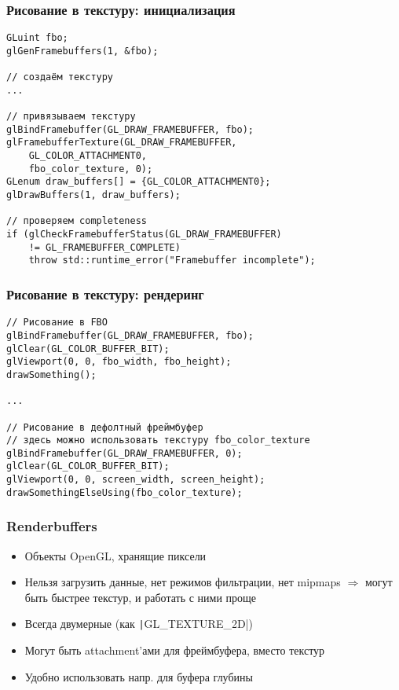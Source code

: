 \documentclass[10pt]{beamer}
\begin{document}
\begin{frame}[fragile]
\frametitle{Рисование в текстуру: инициализация}
\fontsize{8pt}{8pt}
\begin{verbatim}
GLuint fbo;
glGenFramebuffers(1, &fbo);

// создаём текстуру
...

// привязываем текстуру
glBindFramebuffer(GL_DRAW_FRAMEBUFFER, fbo);
glFramebufferTexture(GL_DRAW_FRAMEBUFFER,
    GL_COLOR_ATTACHMENT0,
    fbo_color_texture, 0);
GLenum draw_buffers[] = {GL_COLOR_ATTACHMENT0};
glDrawBuffers(1, draw_buffers);

// проверяем completeness
if (glCheckFramebufferStatus(GL_DRAW_FRAMEBUFFER)
    != GL_FRAMEBUFFER_COMPLETE)
    throw std::runtime_error("Framebuffer incomplete");
\end{verbatim}
\end{frame}

\begin{frame}[fragile]
\frametitle{Рисование в текстуру: рендеринг}
\fontsize{8pt}{8pt}
\begin{verbatim}
// Рисование в FBO
glBindFramebuffer(GL_DRAW_FRAMEBUFFER, fbo);
glClear(GL_COLOR_BUFFER_BIT);
glViewport(0, 0, fbo_width, fbo_height);
drawSomething();

...

// Рисование в дефолтный фреймбуфер
// здесь можно использовать текстуру fbo_color_texture
glBindFramebuffer(GL_DRAW_FRAMEBUFFER, 0);
glClear(GL_COLOR_BUFFER_BIT);
glViewport(0, 0, screen_width, screen_height);
drawSomethingElseUsing(fbo_color_texture);
\end{verbatim}
\end{frame}

\begin{frame}[fragile]
\frametitle{Renderbuffers}
\begin{itemize}
\item Объекты OpenGL, хранящие пиксели
\pause
\item Нельзя загрузить данные, нет режимов фильтрации, нет mipmaps \begin{math}\Longrightarrow\end{math} могут быть быстрее текстур, и работать с ними проще
\pause
\item Всегда двумерные (как \texttt|GL_TEXTURE_2D|)
\pause
\item Могут быть attachment'ами для фреймбуфера, вместо текстур
\pause
\item Удобно использовать напр. для буфера глубины
\end{itemize}
\end{frame}
\end{document}
